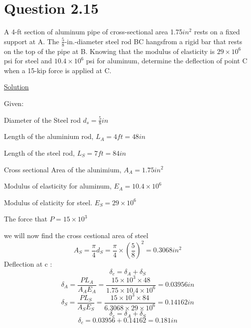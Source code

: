 \documentclass{article}
\begin{document}
\section*{Question 2.15}
A 4-ft section of aluminum pipe of cross-sectional area 1.75$ in^{2}$ rests on a fixed support at A. The $\frac{5} {8}$-in.-diameter steel rod BC hangsfrom a rigid bar that rests on the top of the pipe at B. Knowing that the modulus of elasticity is $29 \times 10^{6}$ psi for steel and $10.4 \times 10^{6}$ psi for aluminum, determine the deflection of point C when a 15-kip force is applied at C.
\begin{center} \underline{Solution}\end{center}
Given:
\begin{center}Diameter of the Steel rod $d_{s}  = \frac{5}{8}in$ \end{center}
\begin{center}Length of the aluminium rod, $L_{A} = 4ft = 48in$ \end{center}
\begin{center}Length of the steel rod, $L_{S} = 7ft = 84in $\end{center}
\begin{center} Cross sectional Area of the alunimium, $A_{A} = 1.75in^{2}$\end{center}
\begin{center}Modulus of elasticity for aluminum, $E_{A} = 10.4 \times 10^{6}$ \end{center}
\begin{center}Modulus of elaticity for steel. $E_{S} = 29 \times 10^{6} $\end{center}
\begin{center}The force that $P = 15 \times 10^{3} $\end{center}
we will now find the cross cestional area of steel
\[A_{S} = \frac{\pi}{4}d_{S} = \frac{ \pi}{4} \times (\frac{5}{8})^{2} = 0.3068in^{2}\]
Deflection at c :
\[\delta_{c} = \delta_{A}+\delta_{S}\]
\[\delta_{A} = \frac{PL_{A}}{A_{A}E_{A}} = \frac{15 \times 10^{3} \times48}{1.75 \times 10.4 \times 10^{6}} = 0.03956in\]
\[\delta_{S} = \frac{PL_{S}}{A_{S}E_{S}} = \frac{15 \times 10^{3} \times84}{6.3068 \times 29 \times 10^{6}} = 0.14162in\]
\[\delta_{c} = \delta_{A}+\delta_{S}\]
\[\delta_{c} = 0.03956 + 0.14162 = 0.181in\]
\end{document}
